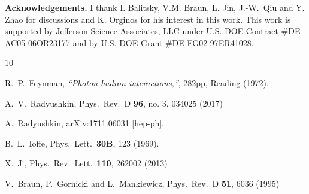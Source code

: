 \documentclass[final,5p,times,twocolumn]{elsarticle}
\begin{document}
  
 
 



{\bf Acknowledgements.} I thank I. Balitsky, V.M. Braun, L. Jin,   \mbox{J.-W. Qiu} and Y. Zhao   for discussions and
K. Orginos    for  his 
 interest in  this work.   
This work is supported by Jefferson Science Associates,
 LLC under  U.S. DOE Contract \#DE-AC05-06OR23177
 and by U.S. DOE Grant \#DE-FG02-97ER41028. 
 
 
 \begin{thebibliography}{10}
 
  R.~P.~Feynman,
  {\it ``Photon-hadron interactions,''}, 282pp, 
  Reading (1972).


  A.~V.~Radyushkin,
  Phys.\ Rev.\ D {\bf 96}, no. 3, 034025 (2017)


  A.~Radyushkin,
  arXiv:1711.06031 [hep-ph].


  B.~L.~Ioffe,
  Phys.\ Lett.\  {\bf 30B}, 123 (1969).


  X.~Ji,
  Phys.\ Rev.\ Lett.\  {\bf 110}, 262002 (2013)


  V.~Braun, P.~Gornicki and L.~Mankiewicz,
  Phys.\ Rev.\ D {\bf 51}, 6036 (1995)



\end{thebibliography}
\end{document}
